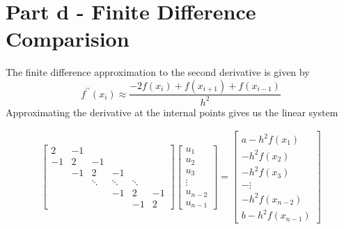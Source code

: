 \documentclass[11pt]{article}
\begin{document}
    \begin{center}
    \end{center}
    { \hspace*{\fill} \\}
    
    \section{Part d - Finite Difference
Comparision}\label{part-d---finite-difference-comparision}

    The finite difference approximation to the second derivative is given by
\[
f^{\prime\prime}(x_i) \approx \frac{-2f(x_i)+f(x_{i+1}) + f(x_{i-1})}{h^2}
\] Approximating the derivative at the internal points gives us the
linear system

\begin{align*}
    \begin{bmatrix}
        2 & -1 & & & & \\
        -1 & 2 & -1 & & & \\
        & -1 & 2 & -1 & & \\
        & & \ddots & \ddots & \ddots & \\
        & & & -1 & 2 & -1 \\
        & & & & -1 & 2
    \end{bmatrix}
    \begin{bmatrix}
        u_1 \\
        u_2 \\
        u_3 \\
        \vdots \\
        u_{n-2} \\
        u_{n-1}
    \end{bmatrix}
    =
    \begin{bmatrix}
        a - h^2f(x_1) \\
        -h^2f(x_2) \\
        -h^2f(x_3) \\
        -\vdots \\
        -h^2f(x_{n-2}) \\
        b - h^2f(x_{n-1})
    \end{bmatrix}
\end{align*}
\end{document}
